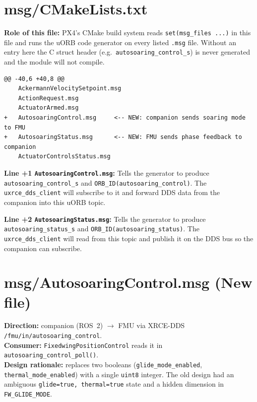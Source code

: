 \documentclass[12pt,a4paper]{article}
\begin{document}
\section{msg/CMakeLists.txt}

\begin{annotation}
\textbf{Role of this file:} PX4's CMake build system reads \texttt{set(msg\_files ...)} in this file and runs the uORB code generator on every listed \texttt{.msg} file. Without an entry here the C struct header (e.g.\ \texttt{autosoaring\_control\_s}) is never generated and the module will not compile.
\end{annotation}

\begin{lstlisting}[style=diff]
@@ -40,6 +40,8 @@
 	AckermannVelocitySetpoint.msg
 	ActionRequest.msg
 	ActuatorArmed.msg
+	AutosoaringControl.msg     <-- NEW: companion sends soaring mode to FMU
+	AutosoaringStatus.msg      <-- NEW: FMU sends phase feedback to companion
 	ActuatorControlsStatus.msg
\end{lstlisting}

\begin{annotation}
\textbf{Line +1 \texttt{AutosoaringControl.msg}:} Tells the generator to produce \texttt{autosoaring\_control\_s} and \texttt{ORB\_ID(autosoaring\_control)}. The \texttt{uxrce\_dds\_client} will subscribe to it and forward DDS data from the companion into this uORB topic.

\textbf{Line +2 \texttt{AutosoaringStatus.msg}:} Tells the generator to produce \texttt{autosoaring\_status\_s} and \texttt{ORB\_ID(autosoaring\_status)}. The \texttt{uxrce\_dds\_client} will read from this topic and publish it on the DDS bus so the companion can subscribe.
\end{annotation}

\section{msg/AutosoaringControl.msg (New file)}

\begin{annotation}
\textbf{Direction:} companion (ROS~2) $\to$ FMU via XRCE-DDS \texttt{/fmu/in/autosoaring\_control}.\\
\textbf{Consumer:} \texttt{FixedwingPositionControl} reads it in \texttt{autosoaring\_control\_poll()}.\\
\textbf{Design rationale:} replaces two booleans (\texttt{glide\_mode\_enabled}, \texttt{thermal\_mode\_enabled}) with a single \texttt{uint8} integer. The old design had an ambiguous \texttt{glide=true, thermal=true} state and a hidden dimension in \texttt{FW\_GLIDE\_MODE}.
\end{annotation}
\end{document}
